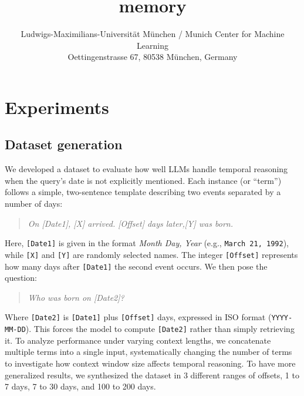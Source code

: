\documentclass[11pt]{article}
\title{memory}
\author{  Ludwigs-Maximilians-Universität München / Munich Center for Machine Learning\\
  Oettingenstrasse 67, 80538 München, Germany \\
}
\begin{document}
\maketitle
\begin{abstract}

\end{abstract}



\section{Experiments}


\subsection{Dataset generation}
We developed a dataset to evaluate how well LLMs handle temporal reasoning when the query's date is not explicitly mentioned. Each instance (or “term”) follows a simple, two-sentence template describing two events separated by a number of days:

\begin{quote}
\emph{On [Date1], [X] arrived. [Offset] days later,[Y] was born.}
\end{quote}

Here, \texttt{[Date1]} is given in the format \textit{Month Day, Year} (e.g., \texttt{March 21, 1992}), while \texttt{[X]} and \texttt{[Y]} are randomly selected names. The integer \texttt{[Offset]} represents how many days after \texttt{[Date1]} the second event occurs. We then pose the question:

\begin{quote}
\emph{Who was born on [Date2]?}
\end{quote}

Where \texttt{[Date2]} is \texttt{[Date1]} plus \texttt{[Offset]} days, expressed in ISO format (\texttt{YYYY-MM-DD}). This forces the model to compute \texttt{[Date2]} rather than simply retrieving it. To analyze performance under varying context lengths, we concatenate multiple terms into a single input, systematically changing the number of terms to investigate how context window size affects temporal reasoning. To have more generalized results, we synthesized the dataset in 3 different ranges of offsets, 1 to 7 days, 7 to 30 days, and 100 to 200 days.
\end{document}
